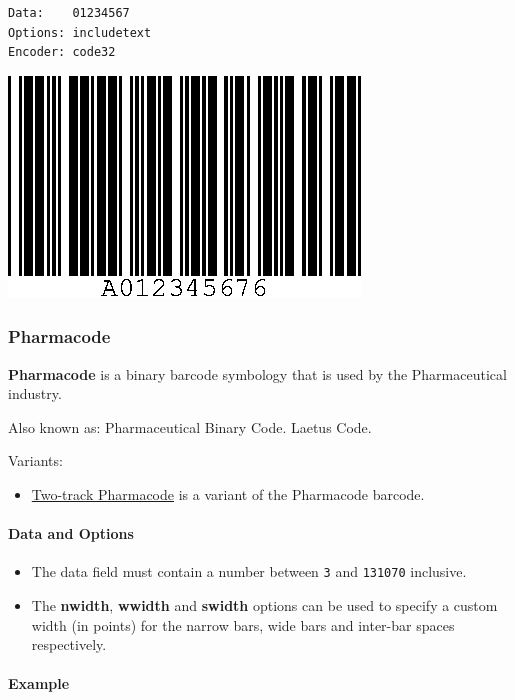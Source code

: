 \begin{verbatim}
Data:    01234567
Options: includetext
Encoder: code32
\end{verbatim}

\includegraphics{images/code32-1.eps}

\hypertarget{pharmacode}{%
\subsubsection{Pharmacode}\label{pharmacode}}

\textbf{Pharmacode} is a binary barcode symbology that is used by the
Pharmaceutical industry.

Also known as: Pharmaceutical Binary Code. Laetus Code.

Variants:

\begin{itemize}
\tightlist
\item
  \protect\hyperlink{two-track-pharmacode}{Two-track Pharmacode} is a
  variant of the Pharmacode barcode.
\end{itemize}

\hypertarget{data-and-options-55}{%
\paragraph{Data and Options}\label{data-and-options-55}}

\begin{itemize}
\tightlist
\item
  The data field must contain a number between \texttt{3} and
  \texttt{131070} inclusive.
\item
  The \textbf{nwidth}, \textbf{wwidth} and \textbf{swidth} options can
  be used to specify a custom width (in points) for the narrow bars,
  wide bars and inter-bar spaces respectively.
\end{itemize}

\hypertarget{example-16}{%
\paragraph{Example}\label{example-16}}

